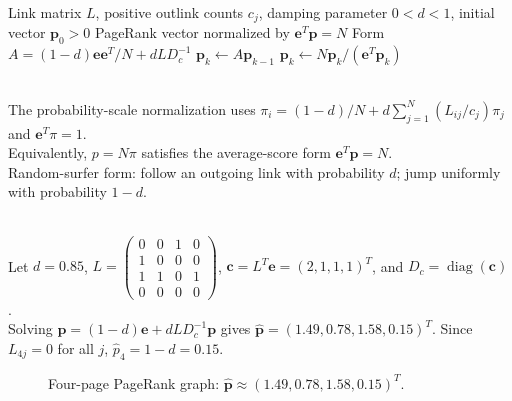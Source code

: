 \begin{breakablealgorithm}
\caption{PageRank by Power Iteration}
\label{alg:sl-pagerank-power-iteration}
\begin{algorithmic}
\Require Link matrix $L$, positive outlink counts $c_j$, damping parameter $0<d<1$, initial vector $\mathbf{p}_0>0$
\Ensure PageRank vector normalized by $\mathbf{e}^T\mathbf{p}=N$
\State Form $A=(1-d)\mathbf{e}\mathbf{e}^T/N+dLD_c^{-1}$
\Repeat
\State $\mathbf{p}_k\gets A\mathbf{p}_{k-1}$
\State $\mathbf{p}_k\gets N\mathbf{p}_k/(\mathbf{e}^T\mathbf{p}_k)$
\end{algorithmic}
\end{breakablealgorithm}

\begin{remark} \label{rem:sl-pagerank-random-surfer-normalization} \\
The probability-scale normalization uses $\pi_i=(1-d)/N+d\sum\limits_{j=1}^N(L_{ij}/c_j)\pi_j$ and $\mathbf{e}^T\pi=1$.\\
Equivalently, $p=N\pi$ satisfies the average-score form $\mathbf{e}^T\mathbf{p}=N$.\\
Random-surfer form: follow an outgoing link with probability $d$; jump uniformly with probability $1-d$.
\end{remark}

\begin{example} \label{ex:sl-pagerank-four-page-network} \\
Let $d=0.85$, $L=\left(\begin{smallmatrix}0&0&1&0\\1&0&0&0\\1&1&0&1\\0&0&0&0\end{smallmatrix}\right)$, $\mathbf{c}=L^T\mathbf{e}=(2,1,1,1)^T$, and $D_c=\operatorname{diag}(\mathbf{c})$.\\
Solving $\mathbf{p}=(1-d)\mathbf{e}+dLD_c^{-1}\mathbf{p}$ gives $\widehat{\mathbf{p}}=(1.49,0.78,1.58,0.15)^T$. Since $L_{4j}=0$ for all $j$, $\widehat p_4=1-d=0.15$.
\end{example}

\begin{figure}[H]
\centering

\caption{Four-page PageRank graph: $\widehat{\mathbf p}\approx(1.49,0.78,1.58,0.15)^T$.}
\label{fig:sl-pagerank-four-page-network}
\end{figure}
